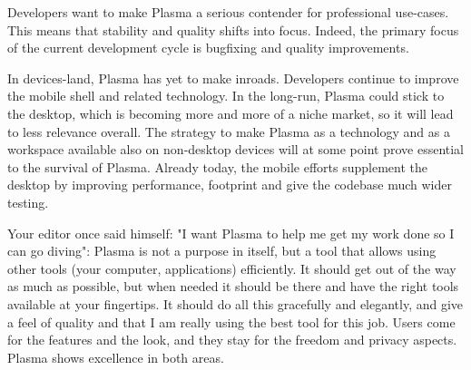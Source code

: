 Developers want to make Plasma a serious contender for professional use-cases. This means that stability and quality shifts into focus. Indeed, the primary focus of the current development cycle is bugfixing and quality improvements.

In devices-land, Plasma has yet to make inroads. Developers continue to improve the mobile shell and related technology. In the long-run, Plasma could stick to the desktop, which is becoming more and more of a niche market, so it will lead to less relevance overall. The strategy to make Plasma as a technology and as a workspace available also on non-desktop devices will at some point prove essential to the survival of Plasma. Already today, the mobile efforts supplement the desktop by improving performance, footprint and give the codebase much wider testing.

Your editor once said himself: "I want Plasma to help me get my work done so I can go diving": Plasma is not a purpose in itself, but a tool that allows using other tools (your computer, applications) efficiently. It should get out of the way as much as possible, but when needed it should be there and have the right tools available at your fingertips. It should do all this gracefully and elegantly, and give a feel of quality and that I am really using the best tool for this job. Users come for the features and the look, and they stay for the freedom and privacy aspects. Plasma shows excellence in both areas.
